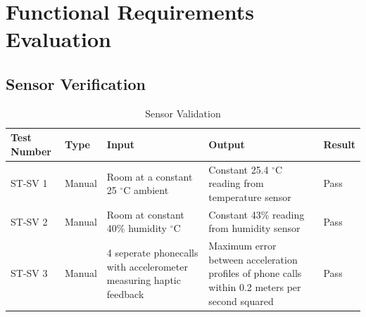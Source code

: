 \documentclass[12pt, titlepage]{article}
\begin{document}

\newpage

\tableofcontents

\listoftables %

\listoffigures %

\newpage




\section{Functional Requirements Evaluation}
\subsection{Sensor Verification}
\begin{table}[H]
  \begin{tabular}{| p{} | p{}| p{}| p{}| p{}|}
    \hline
    \rowcolor[gray]{0.9}
    Test Number & Type & Input & Output & Result\\
    \hline
    ST-SV 1 & Manual & Room at a constant 25 $^{\circ}$C ambient & Constant 25.4 $^{\circ}$C reading from temperature sensor & Pass \\
    \hline
    ST-SV 2 & Manual & Room at constant 40\% humidity $^{\circ}$C & Constant 43\% reading from humidity sensor & Pass \\
    \hline
    ST-SV 3 & Manual & 4 seperate phonecalls with accelerometer measuring haptic feedback & Maximum error between acceleration profiles of phone calls within 0.2 meters per second squared & Pass  \\
    \hline
  \end{tabular}
  \caption{Sensor Validation}
  \end{table}

\end{document}
